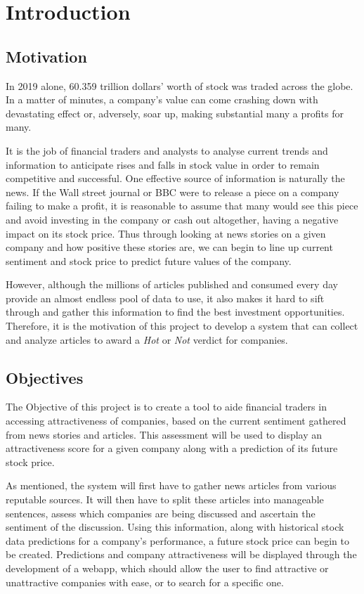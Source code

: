 \chapter{Introduction}



\section{Motivation}
In 2019 alone, 60.359 trillion dollars’ \citep{website:worldbank} worth of stock was traded across the globe. In a matter of minutes, a company’s value can come crashing down with devastating effect or, adversely, soar up, making substantial many a profits for many.

It is the job of financial traders and analysts to analyse current trends and information to anticipate rises and falls in stock value in order to remain competitive and successful. One effective source of information is naturally the news. If the Wall street journal or BBC were to release a piece on a company failing to make a profit, it is reasonable to assume that many would see this piece and avoid investing in the company or cash out altogether, having a negative impact on its stock price. Thus through looking at news stories on a given company and how positive these stories are, we can begin to line up current sentiment and stock price to predict future values of the company.

However, although the millions of articles published and consumed every day provide an almost endless pool of data to use, it also makes it hard to sift through and gather this information to find the best investment opportunities. Therefore, it is the motivation of this project to develop a system that can collect and analyze articles to award a \textit{Hot} or \textit{Not} verdict for companies.

\section{Objectives}
The Objective of this project is to create a tool to aide financial traders in accessing  attractiveness of companies, based on the current sentiment gathered from news stories and articles. This assessment will be used to display an attractiveness score for a given company along with a prediction of its future stock price.

As mentioned, the system will first have to gather news articles from various reputable sources. It will then have to split these articles into manageable sentences, assess which companies are being discussed and ascertain the sentiment of the discussion. Using this information, along with historical stock data predictions for a company’s performance, a future stock price can begin to be created. Predictions and company attractiveness will be displayed through the development of a webapp, which should allow the user to find attractive or unattractive companies with ease, or to search for a specific one.

